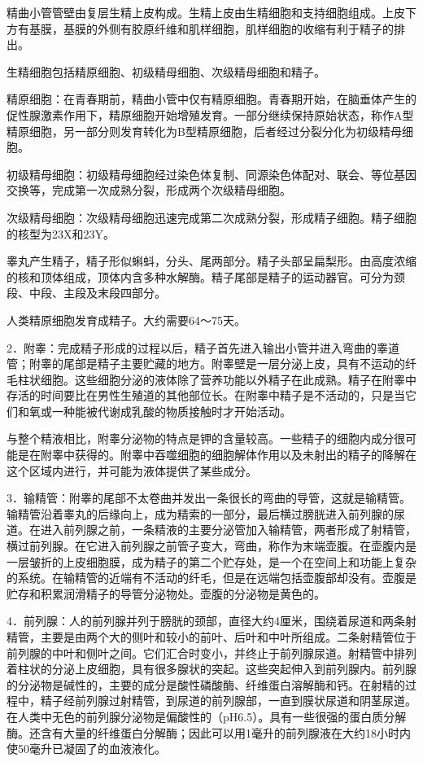 \documentclass[12pt,UTF8]{ctexbook}
\begin{document}
精曲小管管壁由复层生精上皮构成。生精上皮由生精细胞和支持细胞组成。上皮下方有基膜，基膜的外侧有胶原纤维和肌样细胞，肌样细胞的收缩有利于精子的排出。

生精细胞包括精原细胞、初级精母细胞、次级精母细胞和精子。

精原细胞：在青春期前，精曲小管中仅有精原细胞。青春期开始，在脑垂体产生的促性腺激素作用下，精原细胞开始增殖发育。一部分继续保持原始状态，称作A型精原细胞，另一部分则发育转化为B型精原细胞，后者经过分裂分化为初级精母细胞。

初级精母细胞：初级精母细胞经过染色体复制、同源染色体配对、联会、等位基因交换等，完成第一次成熟分裂，形成两个次级精母细胞。

次级精母细胞：次级精母细胞迅速完成第二次成熟分裂，形成精子细胞。精子细胞的核型为23X和23Y。

睾丸产生精子，精子形似蝌蚪，分头、尾两部分。精子头部呈扁梨形。由高度浓缩的核和顶体组成，顶体内含多种水解酶。精子尾部是精子的运动器官。可分为颈段、中段、主段及末段四部分。

人类精原细胞发育成精子。大约需要64～75天。

2．附睾：完成精子形成的过程以后，精子首先进入输出小管并进入弯曲的睾道管；附睾的尾部是精子主要贮藏的地方。附睾壁是一层分泌上皮，具有不运动的纤毛柱状细胞。这些细胞分泌的液体除了营养功能以外精子在此成熟。精子在附睾中存活的时间要比在男性生殖道的其他部位长。在附睾中精子是不活动的，只是当它们和氧或一种能被代谢成乳酸的物质接触时才开始活动。

与整个精液相比，附睾分泌物的特点是钾的含量较高。一些精子的细胞内成分很可能是在附睾中获得的。附睾中吞噬细胞的细胞解体作用以及未射出的精子的降解在这个区域内进行，并可能为液体提供了某些成分。

3．输精管：附睾的尾部不太卷曲并发出一条很长的弯曲的导管，这就是输精管。输精管沿着睾丸的后缘向上，成为精索的一部分，最后横过膀胱进入前列腺的尿道。在进入前列腺之前，一条精液的主要分泌管加入输精管，两者形成了射精管，横过前列腺。在它进入前列腺之前管子变大，弯曲，称作为末端壶腹。在壶腹内是一层皱折的上皮细胞膜，成为精子的第二个贮存处，是一个在空间上和功能上复杂的系统。在输精管的近端有不活动的纤毛，但是在远端包括壶腹部却没有。壶腹是贮存和积累润滑精子的导管分泌物处。壶腹的分泌物是黄色的。

4．前列腺：人的前列腺并列于膀胱的颈部，直径大约4厘米，围绕着尿道和两条射精管，主要是由两个大的侧叶和较小的前叶、后叶和中叶所组成。二条射精管位于前列腺的中叶和侧叶之间。它们汇合时变小，并终止于前列腺尿道。射精管中排列着柱状的分泌上皮细胞，具有很多腺状的突起。这些突起伸入到前列腺内。前列腺的分泌物是碱性的，主要的成分是酸性磷酸酶、纤维蛋白溶解酶和钙。在射精的过程中，精子经前列腺过射精管，到尿道的前列腺部，一直到膜状尿道和阴茎尿道。在人类中无色的前列腺分泌物是偏酸性的（pH6.5）。具有一些很强的蛋白质分解酶。还含有大量的纤维蛋白分解酶；因此可以用1毫升的前列腺液在大约18小时内使50毫升已凝固了的血液液化。
\end{document}
